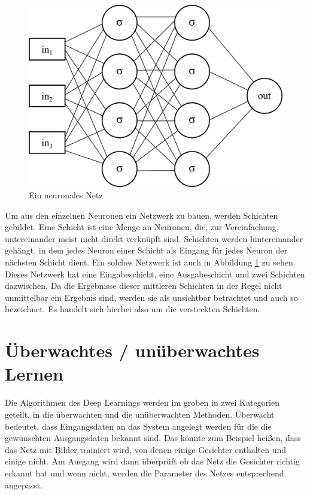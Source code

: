 \begin{figure}
	\centering
		\includegraphics[scale=1]{images/neuron-network.png}
	\caption{Ein neuronales Netz}
	\label{fig:neuron-network}
\end{figure}

Um aus den einzelnen Neuronen ein Netzwerk zu bauen, werden Schichten gebildet. Eine Schicht ist eine Menge an Neuronen, die, zur Vereinfachung, untereinander meist nicht direkt verknüpft sind. Schichten werden hintereinander gehängt, in dem jedes Neuron einer Schicht als Eingang für jedes Neuron der nächsten Schicht dient. Ein solches Netzwerk ist auch in Abbildung \ref{fig:neuron-network} zu sehen. Dieses Netzwerk hat eine Eingabeschicht, eine Ausgabeschicht und zwei Schichten dazwischen. Da die Ergebnisse dieser mittleren Schichten in der Regel nicht unmittelbar ein Ergebnis sind, werden sie als unsichtbar betrachtet und auch so bezeichnet. Es handelt sich hierbei also um die versteckten Schichten.

\section{Überwachtes / unüberwachtes Lernen}

Die Algorithmen des Deep Learnings werden im groben in zwei Kategorien geteilt, in die überwachten und die unüberwachten Methoden. Überwacht bedeutet, dass Eingangsdaten an das System angelegt werden für die die gewünschten Ausgangsdaten bekannt sind. Das könnte zum Beispiel heißen, dass das Netz mit Bilder trainiert wird, von denen einige Gesichter enthalten und einige nicht. Am Ausgang wird dann überprüft ob das Netz die Gesichter richtig erkannt hat und wenn nicht, werden die Parameter des Netzes entsprechend angepasst.

